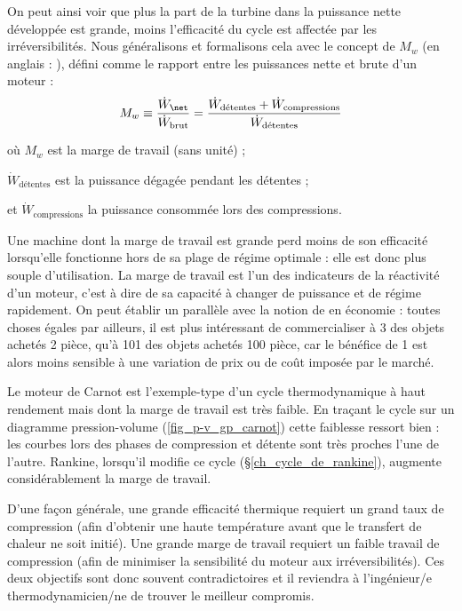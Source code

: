 		On peut ainsi voir que plus la part de la turbine dans la puissance nette développée est grande, moins l’efficacité du cycle est affectée par les irréversibilités. Nous généralisons et formalisons cela avec le concept de  $M_w$ (en anglais : ), défini comme le rapport entre les puissances nette et brute d’un moteur :
		\begin{equation}
			M_w \equiv 	\frac{\dot W_\net}{\dot W_\text{brut}}	= \frac{\dot W_\text{détentes} + \dot W_\text{compressions}}{\dot W_\text{détentes}}
		\end{equation}
		\begin{equationterms}
			\item où \tab $M_w$ 									\tab\tab\tab\tab\tab\tab\tab\tab est la marge de travail (sans unité) ;
			\item \tab $\dot W_\text{détentes}$ 			\tab\tab\tab\tab est la puissance dégagée pendant les détentes ;
			\item et \tab $\dot W_\text{compressions}$ 	\tab la puissance consommée lors des compressions.
		\end{equationterms}

		Une machine dont la marge de travail est grande perd moins de son efficacité lorsqu’elle fonctionne hors de sa plage de régime optimale : elle est donc plus souple d’utilisation. La marge de travail est l’un des indicateurs de la réactivité d’un moteur, c’est à dire de sa capacité à changer de puissance et de régime rapidement. On peut établir un parallèle avec la notion de  en économie : toutes choses égales par ailleurs, il est plus intéressant de commercialiser à \SI{3}{\euroo} des objets achetés \SI{2}{\euroo} pièce, qu’à \SI{101}{\euroo} des objets achetés \SI{100}{\euroo} pièce, car le bénéfice de \SI{1}{\euroo} est alors moins sensible à une variation de prix ou de coût imposée par le marché.
		
			Le moteur de Carnot est l’exemple-type d’un cycle thermodynamique à haut rendement mais dont la marge de travail est très faible. En traçant le cycle sur un diagramme pression-volume (\cref{fig_p-v_gp_carnot}) cette faiblesse ressort bien : les courbes lors des phases de compression et détente sont très proches l’une de l’autre. Rankine, lorsqu’il modifie ce cycle (\S\ref{ch_cycle_de_rankine}), augmente considérablement la marge de travail.

		D’une façon générale, une grande efficacité thermique requiert un grand taux de compression (afin d’obtenir une haute température avant que le transfert de chaleur ne soit initié). Une grande marge de travail requiert un faible travail de compression (afin de minimiser la sensibilité du moteur aux irréversibilités). Ces deux objectifs sont donc souvent contradictoires et il reviendra à l’ingénieur/e thermodynamicien/ne de trouver le meilleur compromis.
		 


